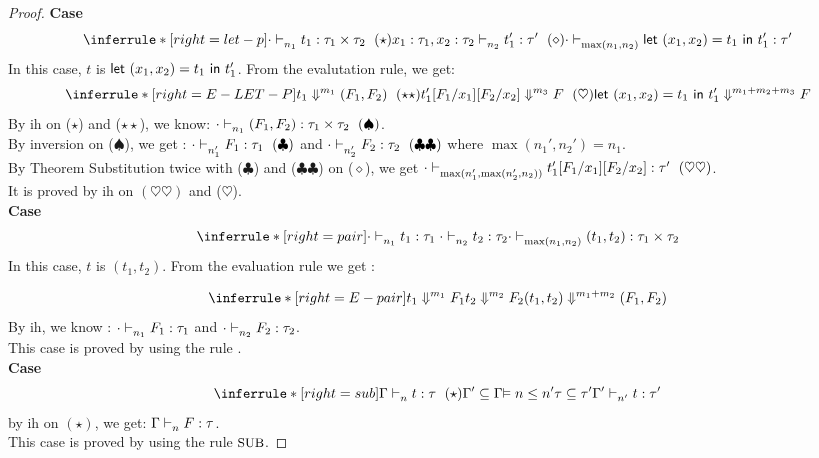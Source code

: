 \documentclass{article}
\begin{document}
\begin{proof}
 \noindent \textbf{Case}
 \[
 \inferrule*[ right = let-p ]
   {\cdot \jtype{n_1}{}{t_1}{\tau_1 \times \tau_2 }~(\star) \\  x_1: \tau_1, x_2 : \tau_2 \jtype{n_2}{}{t_1'}{\tau'}~(\diamond) }
   { \cdot  \jtype{\max(n_1,n_2)}{}{ \letx{(x_1,x_2)}{t_1}{t_1'} }{\tau'}  }
 \]
 In this case, $t$ is $ \mathrel{ \mathsf{let}\ {(x_1,x_2)} = {t_1} \ \mathsf{in} \ {t_1'} } $.
 From the evalutation rule, we get:
 \[
 \inferrule*[ right=E-LET-P]
  {   
    { \eval{ t_1  }{ (F_1,F_2)  }{m_1}~(\star\star) } 
    \\
    { \eval{t_1'[F_1/x_1][F_2/x_2] }{ F}{m_3 }~(\heartsuit) }
  }
  { \eval{  \letx{(x_1,x_2)}{t_1}{t_1'}  }{ F  }{ m_1+m_2+m_3  } }
  \]
 By ih on ($\star$) and ($\star\star$), we know: $ \cdot \mathrel{\vdash_{n_1}^{} {(F_1,F_2)} : {\tau_1 \times \tau_2}}~(\spadesuit) $. \\
 By inversion on ($\spadesuit$), we get : $\cdot \mathrel{\vdash_{n_1'}^{} {F_1} : {\tau_1}} ~(\clubsuit)$ and $\cdot \mathrel{\vdash_{n_2'}^{} {F_2} : {\tau_2}} ~(\clubsuit\clubsuit)$ where $\max(n_1',n_2') = n_1$.\\
 By Theorem Substitution twice with ($\clubsuit$) and ($\clubsuit\clubsuit$) on ($\diamond$), we get $\cdot \mathrel{\vdash_{\max(n_1',\max(n_2',n_2))}^{} {t_1'[F_1/x_1][F_2/x_2]} : {\tau'}} ~(\heartsuit\heartsuit)$.\\
 It is proved by ih on $(\heartsuit\heartsuit)$ and ($\heartsuit$).\\
 
 \noindent \textbf{Case}
 \[
     \inferrule*[right = pair]
   {\cdot \jtype{n_1}{}{t_1}{\tau_1} \\ \cdot \jtype{n_2}{}{t_2}{\tau_2}}
   { \cdot  \jtype{\max(n_1,n_2)}{}{(t_1, t_2)}{\tau_1 \times \tau_2}  }\]
   In this case, $t$ is $(t_1,t_2)$. From the evaluation rule we get :
   
   \[  
   \inferrule*[ right=E-pair]
  {   
    { \eval{ t_1  }{ F_1  }{m_1} }
    \\
    { \eval{ t_2  }{ F_2  }{m_2} } 
  }
  { \eval{  (t_1,t_2)  }{ (F_1,F_2)  }{ m_1+m_2  } } 
  \]
  By ih, we know : $ \cdot \mathrel{\vdash_{n_1}^{} {F_1} : {\tau_1}}$ and $ \cdot \mathrel{\vdash_{n_2}^{} {F_2} : {\tau_2}}$. \\
  This case is proved by using the rule .\\
 
  \noindent \textbf{Case}
\[
  \inferrule*[right = sub]
  { 
   { \Gamma \jtype{n}{}{t}{\tau} ~(\star) } \\
   {  \Gamma' \subseteq \Gamma } \\
   { \vDash n \leq n' } \\
   { \tau \subseteq \tau' }
  }
  { \Gamma' \jtype{n'}{}{t}{\tau'} }
 \]
 by ih on $(\star)$, we get:
 $\Gamma \mathrel{\vdash_{n}^{} {F} : {\tau}}$.\\
 This case is proved by using the rule $\mbox{\small{SUB}}$.
 
\end{proof}
\end{document}
